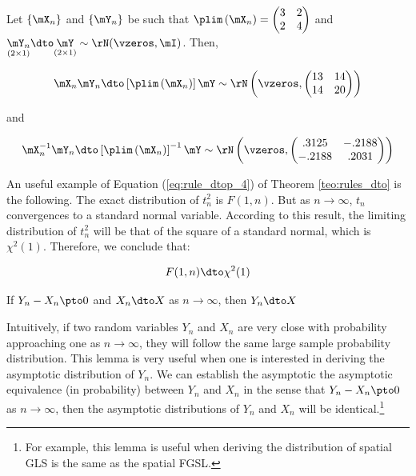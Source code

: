 \begin{example}
Let $\left\lbrace \mX_n\right\rbrace$ and $\left\lbrace \mY_n\right\rbrace$ be such that $\plim\left(\mX_n\right) = \begin{pmatrix} 3 & 2 \\ 2 & 4 \end{pmatrix}$ and $\underset{(2\times 1)}{\mY_n}\dto\underset{(2\times 1)}{\mY}\sim \rN(\vzeros, \mI)$. Then, 

\begin{equation*}
  \mX_n\mY_n\dto \left[\plim\left(\mX_n\right)\right]\mY\sim \rN\left(\vzeros, \begin{pmatrix} 13 & 14 \\ 14 & 20\end{pmatrix}\right)
\end{equation*}

and

\begin{equation*}
  \mX_n^{-1}\mY_n\dto \left[\plim\left(\mX_n\right)\right]^{-1}\mY\sim \rN\left(\vzeros, \begin{pmatrix} .3125 & -.2188 \\ -.2188 & .2031\end{pmatrix}\right)
\end{equation*}
\end{example}

\begin{remark}
An useful example of Equation (\ref{eq:rule_dtop_4}) of Theorem \ref{teo:rules_dto} is the following. The exact distribution of $t_n^2$ is $F(1, n)$. But as $n\to \infty$, $t_n$ convergences to a standard normal variable. According to this result, the limiting distribution of $t_n^2$ will be that of the square of a standard normal, which is $\chi^2(1)$. Therefore, we conclude that:

\begin{equation*}
  F(1, n)\dto \chi^2(1)
\end{equation*}
\end{remark}


\begin{lemma}\label{lemma:asymptotic_equiv}
  If $Y_n - X_n\pto 0$ and $X_n\dto X$ as $n\to \infty$, then $Y_n\dto X$
\end{lemma}

Intuitively, if two random variables $Y_n$ and $X_n$ are very close with probability approaching one as $n\to \infty$, they will follow the same large sample probability distribution. This lemma is very useful when one is interested in deriving the asymptotic distribution of $Y_n$. We can establish the asymptotic the asymptotic equivalence (in probability) between $Y_n$ and $X_n$ in the sense that $Y_n - X_n\pto 0$ as $n\to \infty$, then the asymptotic distributions of $Y_n$ and $X_n$ will be identical.\footnote{For example, this lemma is useful when deriving the distribution of spatial GLS is the same as the spatial FGSL. } 

